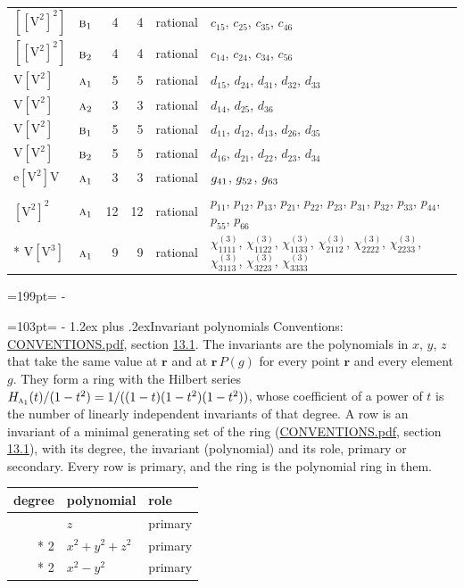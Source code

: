\documentclass[10pt,a4paper]{article}
\makeatletter
\renewcommand\section{\@startsection{section}{1}{\z@}{-3ex plus -1ex minus -.2ex}%
  {1.2ex plus .2ex}{\normalfont\large\sffamily\bfseries\color{parttitle}}}
\newcommand{\needspace}[1]{\par\penalty-100\begingroup\dimen0=#1\relax\dimen2=\pagegoal
  \advance\dimen2-\pagetotal\ifdim\dimen0>\dimen2\relax\ifdim\dimen2>0pt\vfil\break\fi\fi
  \endgroup}
\numberwithin{equation}{section}
\newcommand{\irr}[1]{\text{\normalfont\scshape #1}}
\newcommand{\pointr}{\mathbf{r}}
\newcommand{\jahn}[1]{\mathrm{#1}}
\newlength{\fillwidth}\newlength{\cellwidth}\newlength{\colwidth}
\makeatother
\begin{document}
{\begin{longtable}{@{}llrrl>{\RaggedRight\arraybackslash}p{\fillwidth}@{}}
$\jahn{[[V^{2}]^{2}]}$ & $\irr{b}_{1}$ & 4 & 4 & rational & $c_{15}$, $c_{25}$, $c_{35}$, $c_{46}$\\
$\jahn{[[V^{2}]^{2}]}$ & $\irr{b}_{2}$ & 4 & 4 & rational & $c_{14}$, $c_{24}$, $c_{34}$, $c_{56}$\\
$\jahn{V[V^{2}]}$ & $\irr{a}_{1}$ & 5 & 5 & rational & $d_{15}$, $d_{24}$, $d_{31}$, $d_{32}$, $d_{33}$\\
$\jahn{V[V^{2}]}$ & $\irr{a}_{2}$ & 3 & 3 & rational & $d_{14}$, $d_{25}$, $d_{36}$\\
$\jahn{V[V^{2}]}$ & $\irr{b}_{1}$ & 5 & 5 & rational & $d_{11}$, $d_{12}$, $d_{13}$, $d_{26}$, $d_{35}$\\
$\jahn{V[V^{2}]}$ & $\irr{b}_{2}$ & 5 & 5 & rational & $d_{16}$, $d_{21}$, $d_{22}$, $d_{23}$, $d_{34}$\\
$\jahn{e[V^{2}]V}$ & $\irr{a}_{1}$ & 3 & 3 & rational & $\mathnormal{g}_{41}$, $\mathnormal{g}_{52}$, $\mathnormal{g}_{63}$\\
$\jahn{[V^{2}]^{2}}$ & $\irr{a}_{1}$ & 12 & 12 & rational & $p_{11}$, $p_{12}$, $p_{13}$, $p_{21}$, $p_{22}$, $p_{23}$, $p_{31}$, $p_{32}$, $p_{33}$, $p_{44}$, $p_{55}$, $p_{66}$\\*
$\jahn{V[V^{3}]}$ & $\irr{a}_{1}$ & 9 & 9 & rational & $\chi^{(3)}_{1111}$, $\chi^{(3)}_{1122}$, $\chi^{(3)}_{1133}$, $\chi^{(3)}_{2112}$, $\chi^{(3)}_{2222}$, $\chi^{(3)}_{2233}$, $\chi^{(3)}_{3113}$, $\chi^{(3)}_{3223}$, $\chi^{(3)}_{3333}$\\
\bottomrule\end{longtable}}
\needspace{199pt}
\needspace{103pt}
\section{Invariant polynomials}\label{s:invariant_polynomials}
Conventions: \href{../../CONVENTIONS.pdf}{CONVENTIONS.pdf}, section \href{../../CONVENTIONS.pdf\#conv.13.1}{13.1}.
The invariants are the polynomials in $x$, $y$, $z$ that take the same value at $\pointr$ and at $\pointr\,P(g)$ for every point $\pointr$ and every element $g$. They form a ring with the Hilbert series $H_{\irr{a}_{1}}(t)/(1-t^{2}) = 1/((1-t)(1-t^{2})(1-t^{2}))$, whose coefficient of a power of $t$ is the number of linearly independent invariants of that degree. \label{n:head.degree}\label{n:head.role}A row is an invariant of a minimal generating set of the ring (\href{../../CONVENTIONS.pdf}{CONVENTIONS.pdf}, section \href{../../CONVENTIONS.pdf\#conv.13.1}{13.1}), with its degree, the invariant (polynomial) and its role, primary or secondary. Every row is primary, and the ring is the polynomial ring in them.
{\small\begin{longtable}{@{}rll@{}}\toprule
degree & polynomial & role\\\midrule\endhead
\bottomrule\endfoot\endlastfoot
1 & $z$ & primary\\*
2 & $x^{2} + y^{2} + z^{2}$ & primary\\*
2 & $x^{2} - y^{2}$ & primary\\
\bottomrule\end{longtable}}
\end{document}
